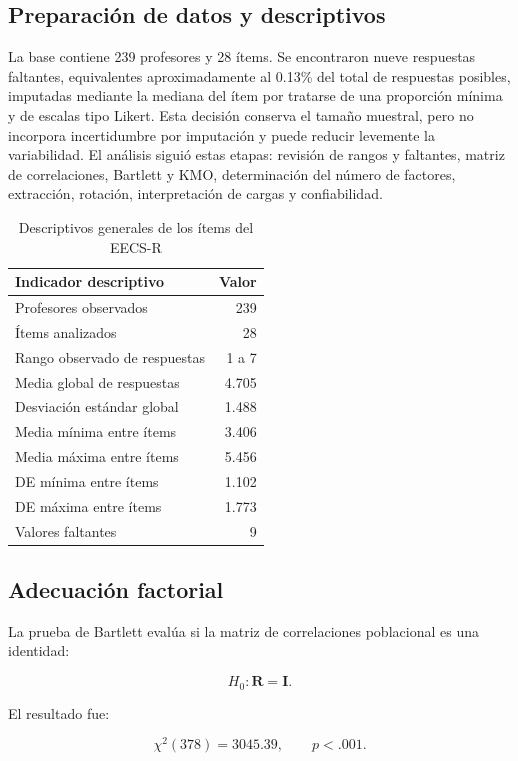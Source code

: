 \documentclass[12pt,letterpaper]{article}
\begin{document}
\subsection{Preparación de datos y descriptivos}

La base contiene 239 profesores y 28 ítems. Se encontraron nueve respuestas faltantes, equivalentes aproximadamente al 0.13\% del total de respuestas posibles, imputadas mediante la mediana del ítem por tratarse de una proporción mínima y de escalas tipo Likert. Esta decisión conserva el tamaño muestral, pero no incorpora incertidumbre por imputación y puede reducir levemente la variabilidad. El análisis siguió estas etapas: revisión de rangos y faltantes, matriz de correlaciones, Bartlett y KMO, determinación del número de factores, extracción, rotación, interpretación de cargas y confiabilidad.

\begin{table}[H]
\centering
\caption{Descriptivos generales de los ítems del EECS-R}
\label{tab:p2-descriptivos}
\begin{tabular}{lr}
\toprule
Indicador descriptivo & Valor \\
\midrule
Profesores observados & 239 \\
Ítems analizados & 28 \\
Rango observado de respuestas & 1 a 7 \\
Media global de respuestas & 4.705 \\
Desviación estándar global & 1.488 \\
Media mínima entre ítems & 3.406 \\
Media máxima entre ítems & 5.456 \\
DE mínima entre ítems & 1.102 \\
DE máxima entre ítems & 1.773 \\
Valores faltantes & 9 \\
\bottomrule
\end{tabular}
\end{table}

\subsection{Adecuación factorial}

La prueba de Bartlett evalúa si la matriz de correlaciones poblacional es una identidad:

\[
H_0:\mathbf{R}=\mathbf{I}.
\]

El resultado fue:

\[
\chi^2(378)=3045.39,\qquad p<.001.
\]
\end{document}
